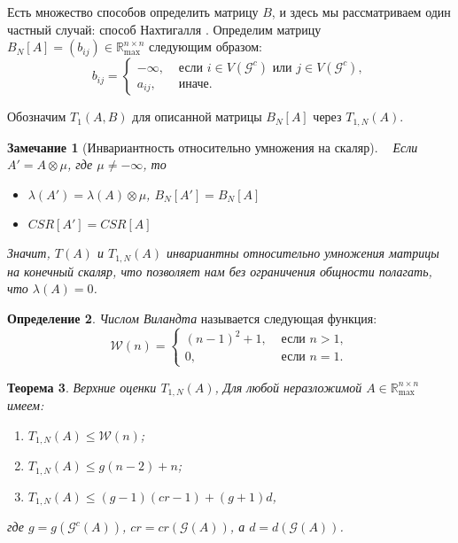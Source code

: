 \documentclass[12pt]{article}
\newtheorem{theorem}{Теорема}[section]
\newtheorem{remark}[theorem]{Замечание}
\theoremstyle{definition}
\newtheorem{definition}[theorem]{Определение}
\begin{document}
Есть множество способов определить матрицу $B$, и здесь мы рассматриваем один частный случай: способ Нахтигалля \cite[страница 170]{15WeakCSRExpantion}. Определим матрицу $B_N[A] = (b_{ij}) \in \mathbb{R}_{\max}^{n \times n}$ следующим образом:
\begin{equation*}
    b_{ij} = 
    \begin{cases}
        -\infty,& \text{ если $i \in V(\mathcal{G}^c)$ или $j\in V(\mathcal{G}^c)$}, \\
        a_{ij},& \text{ иначе.}
    \end{cases}
\end{equation*}

Обозначим $T_1(A, B)$ для описанной матрицы $B_N[A]$ через $T_{1, N}(A)$.

\begin{remark} [Инвариантность относительно умножения на скаляр]\cite[страница 287]{bounds} { \ }
\label{invarianceOfT}
Если $A' = A \otimes \mu$, где $\mu \ne -\infty$, то

\begin{itemize}
	\item $\lambda(A') = \lambda(A) \otimes \mu$, $B_N[A'] = B_N[A]$
	\item $CSR[A'] = CSR[A]$
\end{itemize}

Значит, $T(A)$ и $T_{1, N}(A)$ инвариантны относительно умножения матрицы на конечный скаляр, что позволяет нам без ограничения общности полагать, что $\lambda(A) = 0$.
\end{remark}

\begin{definition}
\textit{Числом Виландта} называется следующая функция:
\begin{equation*}
\mathcal{W}(n) = \begin{cases}
(n - 1)^2 + 1, &\text{ если } n > 1, \\
0, & \text{ если } n = 1.
\end{cases}
\end{equation*}
\end{definition}

\begin{theorem} Верхние оценки $T_{1, N}(A)$, \cite[теорема 4.1]{15WeakCSRExpantion}
Для любой неразложимой $A \in \mathbb{R}_{\max}^{n \times n}$ имеем:
\begin{enumerate} 
    \item $T_{1, N}(A) \le \mathcal{W}(n)$;
    \item $T_{1, N}(A) \le g(n - 2) + n$;
    \item $T_{1, N}(A) \le (g - 1)(cr - 1) + (g + 1) d$,
\end{enumerate}
где $g = g(\mathcal{G}^c(A))$, $cr = cr(\mathcal{G}(A))$, а $d = d(\mathcal{G}(A))$.
\end{theorem}
\end{document}
